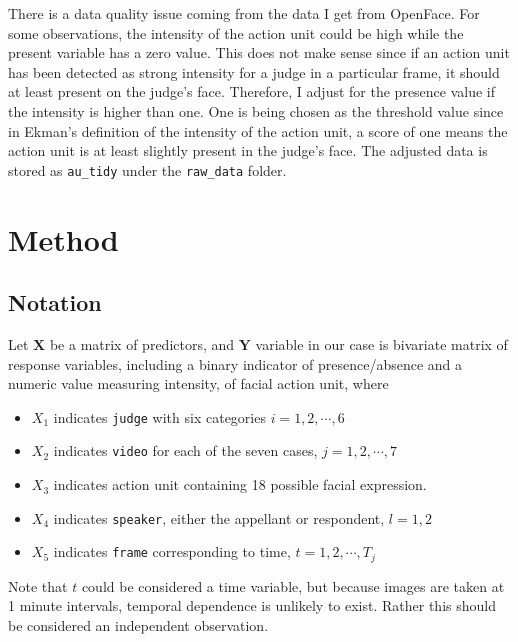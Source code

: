 \documentclass{monashthesis}
\begin{document}
There is a data quality issue coming from the data I get from OpenFace. For some observations, the intensity of the action unit could be high while the present variable has a zero value. This does not make sense since if an action unit has been detected as strong intensity for a judge in a particular frame, it should at least present on the judge's face. Therefore, I adjust for the presence value if the intensity is higher than one. One is being chosen as the threshold value since in Ekman's definition of the intensity of the action unit, a score of one means the action unit is at least slightly present in the judge's face. The adjusted data is stored as \texttt{au\_tidy} under the \texttt{raw\_data} folder.

\hypertarget{method}{%
\chapter{Method}\label{method}}

\hypertarget{notation}{%
\section{Notation}\label{notation}}

Let \(\mathbf{X}\) be a matrix of predictors, and \(\mathbf{Y}\) variable in our case is bivariate matrix of response variables, including a binary indicator of presence/absence and a numeric value measuring intensity, of facial action unit, where

\begin{itemize}
\item
  \(X_1\) indicates \texttt{judge} with six categories \(i = 1,2, \cdots, 6\)
\item
  \(X_2\) indicates \texttt{video} for each of the seven cases, \(j = 1,2, \cdots, 7\)
\item
  \(X_3\) indicates action unit containing 18 possible facial expression.
\item
  \(X_4\) indicates \texttt{speaker}, either the appellant or respondent, \(l=1,2\)
\item
  \(X_5\) indicates \texttt{frame} corresponding to time, \(t = 1,2, \cdots, T_j\)
\end{itemize}

Note that \(t\) could be considered a time variable, but because images are taken at 1 minute intervals, temporal dependence is unlikely to exist. Rather this should be considered an independent observation.
\end{document}

